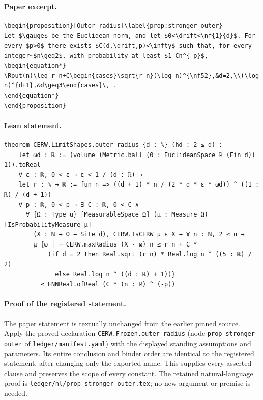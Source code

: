 \paragraph{Paper excerpt.}
\begin{verbatim}
\begin{proposition}[Outer radius]\label{prop:stronger-outer}
Let $\gauge$ be the Euclidean norm, and let $0<\drift<\nf{1}{d}$. For every $p>0$ there exists $C(d,\drift,p)<\infty$ such that, for every integer~$n\geq2$, with probability at least $1-Cn^{-p}$,
\begin{equation*}
\Rout(n)\leq r_n+C\begin{cases}\sqrt{r_n}(\log n)^{\nf52},&d=2,\\(\log n)^{d+1},&d\geq3\end{cases}\, .
\end{equation*}
\end{proposition}
\end{verbatim}
\paragraph{Lean statement.}
\begin{verbatim}
theorem CERW.LimitShapes.outer_radius {d : ℕ} (hd : 2 ≤ d) :
    let ωd : ℝ := (volume (Metric.ball (0 : EuclideanSpace ℝ (Fin d)) 1)).toReal
    ∀ ε : ℝ, 0 < ε → ε < 1 / (d : ℝ) →
    let r : ℕ → ℝ := fun n => ((d + 1) * n / (2 * d * ε * ωd)) ^ ((1 : ℝ) / (d + 1))
    ∀ p : ℝ, 0 < p → ∃ C : ℝ, 0 < C ∧
      ∀ {Ω : Type u} [MeasurableSpace Ω] (μ : Measure Ω) [IsProbabilityMeasure μ]
        (X : ℕ → Ω → Site d), CERW.IsCERW μ ε X → ∀ n : ℕ, 2 ≤ n →
        μ {ω | ¬ CERW.maxRadius (X · ω) n ≤ r n + C *
            (if d = 2 then Real.sqrt (r n) * Real.log n ^ ((5 : ℝ) / 2)
              else Real.log n ^ ((d : ℝ) + 1))}
          ≤ ENNReal.ofReal (C * (n : ℝ) ^ (-p))
\end{verbatim}
\paragraph{Proof of the registered statement.}
The paper statement is textually unchanged from the earlier pinned source.
Apply the proved declaration \texttt{CERW.Frozen.outer\_radius}
(node \texttt{prop-stronger-outer} of \texttt{ledger/manifest.yaml}) with the displayed
standing assumptions and parameters. Its entire conclusion and binder order
are identical to the registered statement, after changing only the exported
name. This supplies every asserted clause and preserves the scope of every
constant. The retained natural-language proof is
\texttt{ledger/nl/prop-stronger-outer.tex}; no new argument or premise is needed.
